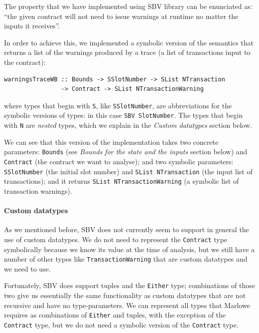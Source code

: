 \documentclass[runningheads]{llncs}
\begin{document}
The property that we have implemented using SBV library can be enunciated as: ``the given contract will not need to issue warnings at runtime no matter the inputs it receives''. 

In order to achieve this, we implemented a symbolic version of the semantics that returns a list of the warnings produced by a trace (a list of transactions input to the contract):

\begin{verbatim}
warningsTraceWB :: Bounds -> SSlotNumber -> SList NTransaction
                -> Contract -> SList NTransactionWarning
\end{verbatim}

\noindent
where types that begin with \texttt{S}, like \texttt{SSlotNumber}, are abbreviations for the symbolic versions of types: in this case \texttt{SBV SlotNumber}.
The types that begin with \texttt{N} are \textit{nested} types, which we explain in the \textit{Custom datatypes} section below.

We can see that this version of the implementation takes two concrete parameters: \texttt{Bounds} (see \textit{Bounds for the state and the inputs} section below) and \texttt{Contract} (the contract we want to analyse); and two symbolic parameters: \texttt{SSlotNumber} (the initial slot number) and \texttt{SList NTransaction} (the input list of transactions); and it returns \texttt{SList NTransactionWarning} (a symbolic list of transaction warnings).

\paragraph{Custom datatypes}

As we mentioned before, SBV does not currently seem to support in general the use of custom datatypes. We do not need to represent the \texttt{Contract} type symbolically because we know its value at the time of analysis, but we still have a number of other types like \texttt{TransactionWarning} that are custom datatypes and we need to use.

Fortunately, SBV does support tuples and the \texttt{Either} type; combinations of those two give us essentially the same functionality as custom datatypes that are not recursive and have no type-parameters. We can represent all types that Marlowe requires as combinations of \texttt{Either} and tuples, with the exception of the \texttt{Contract} type, but we do not need a symbolic version of the \texttt{Contract} type.
\end{document}
